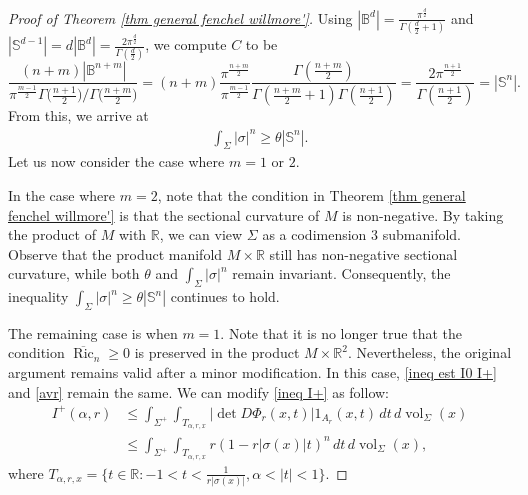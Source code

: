 \documentclass[11pt, reqno]{amsart}
\numberwithin{equation}{section}
\begin{document}
\begin{proof}[Proof of Theorem \ref{thm general fenchel willmore'}]
Using $|\mathbb B^{d}|=\frac{\pi^{\frac{d}{2}}}{\Gamma\left(\tfrac d2+1\right)}$ and
$|\mathbb S^{d-1}|=d|\mathbb B^{d}|=\frac{2\pi^{\frac{d}{2}}}{\Gamma\left(\tfrac d2\right)}$, we compute $C$ to be
$$
\frac{(n+m) |\mathbb B^{n+m}|}{
\pi^{ \frac{m-1}{2}} \Gamma\bigl(\tfrac{n+1}{2}\bigr)/ \Gamma\bigl(\tfrac{n+m}{2}\bigr)}
=(n+m) \frac{\pi^{\frac{n+m}{2}}}{\pi^{\frac{m-1}{2}}} \frac{\Gamma(\tfrac{n+m}{2})}{ \Gamma(\tfrac{n+m}{2}+1)\Gamma(\tfrac{n+1}{2})}
=\frac{2\pi^{\frac{n+1}{2}}}{ \Gamma(\tfrac{n+1}{2})}
=|\mathbb S^{n}|.
$$
From this, we arrive at
\begin{align*}
\int_\Sigma |\sigma|^n\ge \theta|\mathbb S^n|.
\end{align*}
Let us now consider the case where $m=1$ or $2$.

In the case where $m=2$, note that the condition in Theorem \ref{thm general fenchel willmore'} is that the sectional curvature of $M$ is non-negative. By taking the product of $M$ with $\mathbb{R}$, we can view $\Sigma$ as a codimension $3$ submanifold. Observe that the product manifold $M \times \mathbb{R}$ still has non-negative sectional curvature, while both $\theta$ and $\int_{\Sigma}|\sigma|^n$ remain invariant. Consequently, the inequality $\int_\Sigma |\sigma|^n \ge \theta|\mathbb S^{n}|$ continues to hold.

The remaining case is when $m=1$. Note that it is no longer true that the condition $\overline{\operatorname{Ric}}_n \ge 0$ is preserved in the product $M \times \mathbb{R}^2$. Nevertheless, the original argument remains valid after a minor modification. In this case, \eqref{ineq est I0 I+} and \eqref{avr} remain the same. We can modify \eqref{ineq I+} as follow:
\begin{equation*}\label{ineq I+'}
\begin{aligned}
I^{+}(\alpha, r) & \le \int_{\Sigma^{+}} \int_{T_{\alpha, r, x}} \left|\det D \Phi_r(x, t)\right| 1_{A_r}(x, t)\, d t\, d \operatorname{vol}_{\Sigma}(x) \\
& \le \int_{\Sigma^{+}} \int_{T_{\alpha, r, x}} r(1-r|\sigma(x)| t)^n\, d t\, d \operatorname{vol}_{\Sigma}(x),
\end{aligned}
\end{equation*}
where $T_{\alpha, r, x}=\{t\in \mathbb R: -1<t<\frac{1}{r|\sigma(x)|}, \alpha<|t|<1\}$.


\end{proof}
\end{document}
